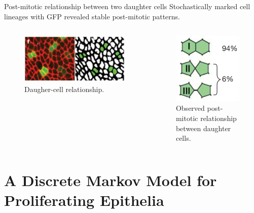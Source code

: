 \documentclass[aspectratio=169, 10pt]{beamer}
\begin{document}
\begin{frame}[fragile]{Post-mitotic relationship between two daughter cells}
  Stochastically marked cell lineages with GFP revealed stable post-mitotic patterns.     
  \begin{columns}[]
    \begin{figure}[b]
      \centering
      \includegraphics[width=\textwidth]{figures/daughter-cell-relationship.png}
      \caption{Daugher-cell relationship.}
      \label{}
    \end{figure}
        \begin{figure}[b]
            \centering
            \includegraphics[width=.4\textwidth]{figures/post-mitotic-relationship.png}
            \caption{Observed post-mitotic relationship between daughter cells.}
            \label{}
    \end{figure}
  \end{columns}  
\end{frame}

\section{A Discrete Markov Model for Proliferating Epithelia}
\end{document}
